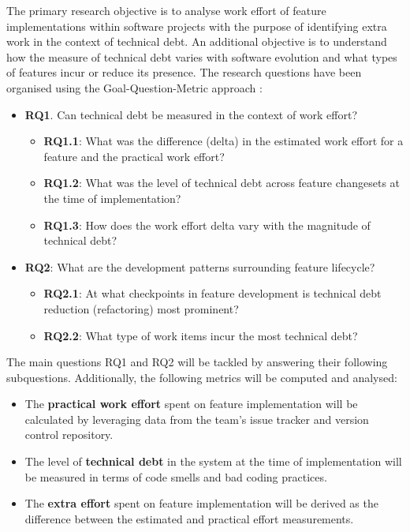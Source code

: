 The primary research objective is to analyse work effort of feature
implementations within software projects with the purpose of identifying extra
work in the context of technical debt. An additional objective is to understand
how the measure of technical debt varies with software evolution and what types
of features incur or reduce its presence. The research questions have been
organised using the Goal-Question-Metric approach \cite{VanSolingen2002}:
\begin{itemize}
	\item \textbf{RQ1}. Can technical debt be measured in the context of work
	      effort?
	      \begin{itemize}
		      \item \textbf{RQ1.1}: What was the difference (delta) in the
		            estimated work effort for a feature and the practical work
		            effort?
		      \item \textbf{RQ1.2}: What was the level of technical debt across
		            feature changesets at the time of implementation?
		      \item \textbf{RQ1.3}: How does the work effort delta vary with the
		            magnitude of technical debt?
	      \end{itemize}
	\item \textbf{RQ2}: What are the development patterns surrounding feature
	      lifecycle?
	      \begin{itemize}
		      \item \textbf{RQ2.1}: At what checkpoints in feature development
		            is technical debt reduction (refactoring) most prominent?
		      \item \textbf{RQ2.2}: What type of work items incur the most
		            technical debt?
	      \end{itemize}
\end{itemize}

The main questions RQ1 and RQ2 will be tackled by answering their following
subquestions. Additionally, the following metrics will be computed and analysed:
\begin{itemize}
	\item The \textbf{practical work effort} spent on feature implementation
	      will be calculated by leveraging data from the team's issue tracker and
	      version control repository.
	\item The level of \textbf{technical debt} in the system at the time of
	      implementation will be measured in terms of code smells and bad coding
	      practices.
	\item The \textbf{extra effort} spent on feature implementation will be
	      derived as the difference between the estimated and practical effort
	      measurements.
\end{itemize}

